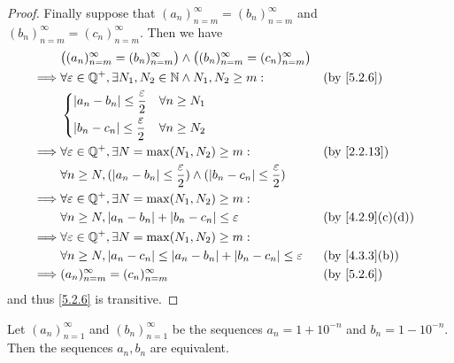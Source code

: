 \begin{proof}
  Finally suppose that \((a_n)_{n = m}^\infty = (b_n)_{n = m}^\infty\) and \((b_n)_{n = m}^\infty = (c_n)_{n = m}^\infty\).
  Then we have
  \begin{align*}
             & \big((a_n)_{n = m}^\infty = (b_n)_{n = m}^\infty\big) \land \big((b_n)_{n = m}^\infty = (c_n)_{n = m}^\infty\big)                        \\
    \implies & \forall \varepsilon \in \Q^+, \exists N_1, N_2 \in \N \land N_1, N_2 \geq m:                                        &  & \by{5.2.6}      \\
             & \begin{dcases}
                 \abs{a_n - b_n} \leq \dfrac{\varepsilon}{2} & \forall n \geq N_1 \\
                 \abs{b_n - c_n} \leq \dfrac{\varepsilon}{2} & \forall n \geq N_2 \\
               \end{dcases}                                                                         \\
    \implies & \forall \varepsilon \in \Q^+, \exists N = \max(N_1, N_2) \geq m:                                                    &  & \by{2.2.13}     \\
             & \forall n \geq N, (\abs{a_n - b_n} \leq \dfrac{\varepsilon}{2}) \land (\abs{b_n - c_n} \leq \dfrac{\varepsilon}{2})                      \\
    \implies & \forall \varepsilon \in \Q^+, \exists N = \max(N_1, N_2) \geq m:                                                                         \\
             & \forall n \geq N, \abs{a_n - b_n} + \abs{b_n - c_n} \leq \varepsilon                                                &  & \by{4.2.9}[c,d] \\
    \implies & \forall \varepsilon \in \Q^+, \exists N = \max(N_1, N_2) \geq m:                                                                         \\
             & \forall n \geq N, \abs{a_n - c_n} \leq \abs{a_n - b_n} + \abs{b_n - c_n} \leq \varepsilon                           &  & \by{4.3.3}[b]   \\
    \implies & (a_n)_{n = m}^\infty = (c_n)_{n = m}^\infty                                                                         &  & \by{5.2.6}
  \end{align*}
  and thus \cref{5.2.6} is transitive.
\end{proof}

\begin{prop}\label{5.2.8}
  Let \((a_n)_{n = 1}^{\infty}\) and \((b_n)_{n = 1}^{\infty}\) be the sequences \(a_n = 1 + 10^{-n}\) and \(b_n = 1 - 10^{-n}\).
  Then the sequences \(a_n, b_n\) are equivalent.
\end{prop}

